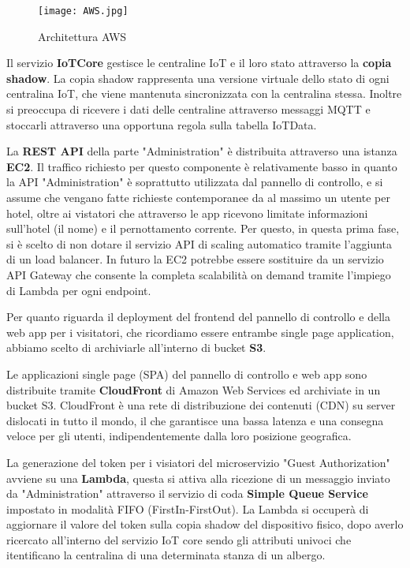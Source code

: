\begin{figure}[H]
    \texttt{[image: AWS.jpg]}
    \centering
    \caption[aws]{Architettura AWS}
    \label{fig:aws}
\end{figure}

Il servizio \textbf{IoTCore} gestisce le centraline IoT e il loro stato attraverso la \textbf{copia shadow}. La copia shadow rappresenta una versione virtuale dello stato di ogni centralina IoT, che viene mantenuta sincronizzata con la centralina stessa. Inoltre si preoccupa di ricevere i dati delle centraline attraverso messaggi MQTT e stoccarli attraverso una opportuna regola sulla tabella IoTData.

La \textbf{REST API} della parte "Administration" è distribuita attraverso una istanza \textbf{EC2}.
Il traffico richiesto per questo componente è relativamente basso in quanto la API "Administration" è soprattutto utilizzata dal pannello di controllo, e si assume che vengano fatte richieste contemporanee da al massimo un utente per hotel, oltre ai vistatori che attraverso le app ricevono limitate informazioni sull'hotel (il nome) e il pernottamento corrente.
Per questo, in questa prima fase, si è scelto di non dotare il servizio API di scaling automatico tramite l'aggiunta di un load balancer.
In futuro la EC2 potrebbe essere sostituire da un servizio API Gateway che consente la completa scalabilità on demand tramite l'impiego di Lambda per ogni endpoint.

Per quanto riguarda il deployment del frontend del pannello di controllo e della web app per i visitatori, che ricordiamo essere entrambe single page application, abbiamo scelto di archiviarle all'interno di bucket \textbf{S3}. 

Le applicazioni single page (SPA) del pannello di controllo e web app sono distribuite tramite \textbf{CloudFront} di Amazon Web Services ed archiviate in un bucket S3. CloudFront è una rete di distribuzione dei contenuti (CDN) su server dislocati in tutto il mondo, il che garantisce una bassa latenza e una consegna veloce per gli utenti, indipendentemente dalla loro posizione geografica.

La generazione del token per i visiatori del microservizio "Guest Authorization" avviene su una \textbf{Lambda}, questa si attiva alla ricezione di un messaggio inviato da "Administration" attraverso il servizio di coda \textbf{Simple Queue Service} impostato in modalità FIFO (FirstIn-FirstOut). La Lambda si occuperà di aggiornare il valore del token sulla copia shadow del dispositivo fisico, dopo averlo ricercato all'interno del servizio IoT core sendo gli attributi univoci che itentificano la centralina di una determinata stanza di un albergo.

